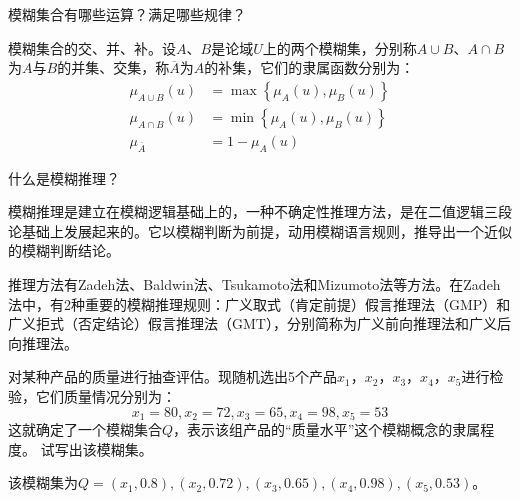 \begin{question}
模糊集合有哪些运算？满足哪些规律？
\end{question}
\begin{solution}
模糊集合的交、并、补。设$A$、$B$是论域$U$上的两个模糊集，分别称$A \cup B$、$A \cap B$为$A$与$B$的并集、交集，称$\overline{A}$为$A$的补集，它们的隶属函数分别为：
	\begin{align*}
		\mu_{A \cup B}(u) &= \max \left\{ \mu_A(u), \mu_B(u) \right\} \\
		\mu_{A \cap B}(u) &= \min \left\{ \mu_A(u), \mu_B(u) \right\} \\
		\mu_{\overline{A}} &= 1 - \mu_A(u)
	\end{align*}
\end{solution}

\begin{question}
什么是模糊推理？
\end{question}
\begin{solution}
模糊推理是建立在模糊逻辑基础上的，一种不确定性推理方法，是在二值逻辑三段论基础上发展起来的。它以模糊判断为前提，动用模糊语言规则，推导出一个近似的模糊判断结论。\par
推理方法有Zadeh法、Baldwin法、Tsukamoto法和Mizumoto法等方法。在Zadeh法中，有2种重要的模糊推理规则：广义取式（肯定前提）假言推理法（GMP）和广义拒式（否定结论）假言推理法（GMT），分别简称为广义前向推理法和广义后向推理法。  
\end{solution}

\begin{question}
对某种产品的质量进行抽查评估。现随机选出5个产品$x_1$，$x_2$，$x_3$，$x_4$，$x_5$进行检验，它们质量情况分别为：
\[ x_1=80, x_2=72, x_3=65, x_4=98, x_5=53\]
这就确定了一个模糊集合$Q$，表示该组产品的``质量水平''这个模糊概念的隶属程度。
试写出该模糊集。
\end{question}
\begin{solution}
该模糊集为$Q={(x_1,0.8), (x_2, 0.72), (x_3,0.65), (x_4,0.98), (x_5,0.53)}$。
\end{solution}

